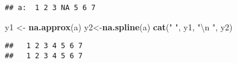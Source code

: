 \documentclass[]{article}
\newenvironment{Shaded}{\begin{snugshade}}{\end{snugshade}}
\newcommand{\CharTok}[1]{\textcolor[rgb]{0.31,0.60,0.02}{#1}}
\newcommand{\KeywordTok}[1]{\textcolor[rgb]{0.13,0.29,0.53}{\textbf{#1}}}
\newcommand{\NormalTok}[1]{#1}
\newcommand{\StringTok}[1]{\textcolor[rgb]{0.31,0.60,0.02}{#1}}
\begin{document}
\begin{verbatim}
## a:  1 2 3 NA 5 6 7
\end{verbatim}

\begin{Shaded}
\begin{Highlighting}[]
\NormalTok{y1 <-}\StringTok{ }\KeywordTok{na.approx}\NormalTok{(a)}
\NormalTok{y2<-}\KeywordTok{na.spline}\NormalTok{(a)}
\KeywordTok{cat}\NormalTok{(}\StringTok{" "}\NormalTok{, y1, }\StringTok{"}\CharTok{\textbackslash{}n}\StringTok{ "}\NormalTok{, y2)}
\end{Highlighting}
\end{Shaded}

\begin{verbatim}
##   1 2 3 4 5 6 7 
##   1 2 3 4 5 6 7
\end{verbatim}
\end{document}
